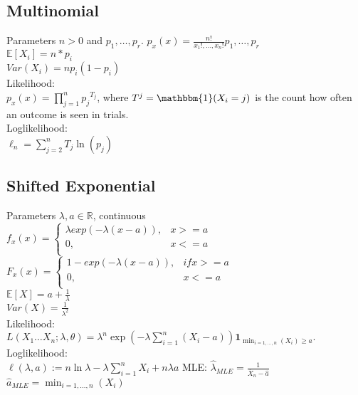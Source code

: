 \subsection*{Multinomial}
Parameters $n>0$ and $p_1, \ldots, p_r$.
$p_x(x)= \frac{n!}{x_1!,\ldots,x_n!} p_1, \ldots, p_r$\\
$\mathbb{E}[X_i]=n*p_i$\\
$Var(X_i)=np_i(1-p_i)$\\
Likelihood:\\
$p_x(x)= \prod _{j=1}^{n}{p_{{j}}}^{T_{{j}}}$, where $T^j=\mathbbm{1}( X_i=j)$ is the count how often an outcome is seen in trials. \\
Loglikelihood:\\
$\ell_n= \sum _{j=2}^{n}T_{{j}}\ln  \left( p_{{j}} \right)$\\
\subsection*{Shifted Exponential}
Parameters $\lambda, a \in \mathbb{R}$, continuous\\
$ f_x(x)=
	\begin{cases}
		 \lambda exp(-\lambda(x - a )),&{x >= a}\\
		0,&{x <= a}\\
	\end{cases}
$\\
$ F_x(x)=
	\begin{cases}
		 1-exp(-\lambda(x-a)),&{if x >= a}\\
		0,&{x <= a}\\
	\end{cases}
$\\
$\mathbb{E}[X]=a + \frac{1}{\lambda}$\\
$Var(X)=\frac{1}{\lambda^2}$\\
Likelihood:\\
$L(X_1\dots X_n;\lambda,\theta)= \lambda ^ n \exp \left( -\lambda \sum _{i = 1}^ n (X_ i - a) \right) \mathbf{1}_{\min _{i = 1, \ldots , n}(X_ i) \geq a}.$
Loglikelihood:\\
$\ell (\lambda , a) := n \ln \lambda - \lambda \sum _{i = 1}^ n X_ i + n \lambda a$
MLE:
$\hat{\lambda }_{MLE} = \frac{1}{\overline{X}_ n - \hat{a}}$\\
$\hat{a}_{MLE} = \min _{i =1, \ldots , n}(X_ i)$ \\
